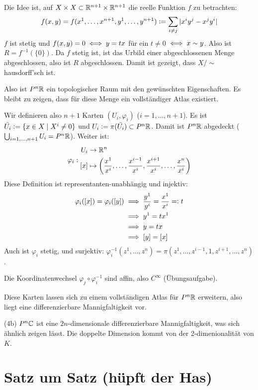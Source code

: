 \documentclass[a4paper,twoside,DIV15,BCOR12mm]{scrbook}
\renewcommand{\da}{\mathrel{\DOTSB\mathop:}=}
\newcommand{\ad}{=\mathrel{\DOTSB\mathop:}}
\begin{document}
\begin{beispiele}
Die Idee ist, auf $X\times X \subset \mathbb{R}^{n+1} \times \mathbb{R}^{n+1}$ die reelle Funktion $f$ zu betrachten:
\[
f(x,y) = f(x^1,\ldots,x^{n+1},y^1,\ldots,y^{n+1}) \da \sum_{i\ne j} |x^iy^j - x^jy^i|
\]
$f$ ist stetig und $f(x,y) = 0 \iff y = t x$ für ein $t\ne 0$ $\iff x\sim y$. Also ist $R = f^{-1}(\{0\})$. Da $f$ stetig ist, ist das Urbild einer abgeschlossenen Menge abgeschlossen, also ist $R$ abgeschlossen. Damit ist gezeigt, dass $X/\sim$ hausdorff’sch ist.

Also ist $P^n\mathbb{R}$ ein topologischer Raum mit den gewünschten Eigenschaften. Es bleibt zu zeigen, dass für diese Menge ein vollständiger Atlas existiert.

Wir definieren also $n+1$ Karten $(U_i,\varphi_i)$ ($i=1,\ldots,n+1$). Es ist $\bar{U_i} \da \{x \in X\mid X^i\ne 0\}$ und $U_i \da \pi(\bar{U_i}) \subset P^n\MdR$. Damit ist $P^n\mathbb{R}$ abgedeckt ($\bigcup_{i=1,\ldots,n+1}U_i = P^n\mathbb{R}$). Weiter ist:
\[
\varphi_i :
\begin{aligned}
U_i &\to \mathbb{R}^n \\
[x] &\mapsto \left( \frac{x^1}{x^i},\ldots,\frac{x^{i-1}}{x^i},\frac{x^{i+1}}{x^i},\ldots,\frac{x^n}{x^i}\right)
\end{aligned}
\]
Diese Definition ist representanten-unabhängig und injektiv:
\begin{align*}
\varphi_i([x]) = \varphi_i([y]) 
& \folgt \frac{y^1}{y^i} = \frac{x^1}{x^i} \ad t \\
& \folgt y^1 = tx^1 \\
& \folgt y = tx \\
& \folgt [y] = [x]
\end{align*}
Auch ist $\varphi_i$ stetig, und surjektiv: $\varphi_i^{-1}(z^1,\ldots,z^n) = \pi(z^1,\ldots,z^{i-1},1,z^{i+1},\ldots,z^n)$.

Die Koordinatenwechsel $\varphi_j\circ \varphi_i^{-1}$ sind affin, also $C^\infty$ (Übungsaufgabe).

Diese Karten lassen sich zu einem vollständigen Atlas für $P^n\mathbb{R}$ erweitern, also liegt eine differenzierbare Mannigfaltigkeit vor.

\item[(4b)] $P^n\mathbb{C}$ ist eine $2n$-dimensionale differenzierbare Mannigfaltigkeit, was sich ähnlich zeigen lässt. Die doppelte Dimension kommt von der 2-dimenionalität von $K$.

\end{beispiele}


\appendix
\chapter{Satz um Satz (hüpft der Has)}

\renewcommand{\indexname}{Stichwortverzeichnis}
\addtocounter{chapter}{1}
\printindex
\end{document}
